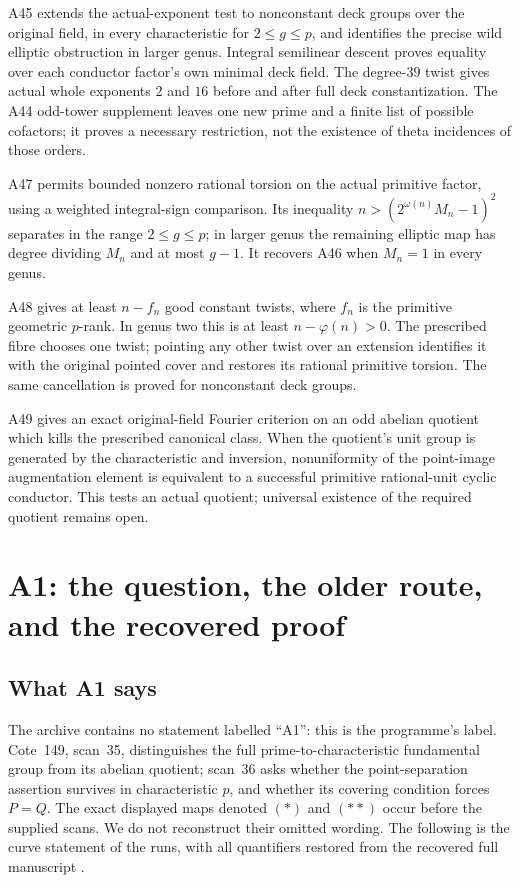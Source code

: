 \documentclass[11pt,a4paper]{article}
\begin{document}
A45 extends the actual-exponent test to nonconstant deck groups over the
original field, in every characteristic for $2\le g\le p$, and identifies
the precise wild elliptic obstruction in larger genus. Integral semilinear
descent proves equality over each conductor factor's own minimal deck field.
The degree-$39$ twist gives actual whole exponents $2$ and $16$ before and
after full deck constantization. The A44 odd-tower supplement leaves one
new prime and a finite list of possible cofactors; it proves a necessary
restriction, not the existence of theta incidences of those orders.

A47 permits bounded nonzero rational torsion on the actual primitive
factor, using a weighted integral-sign comparison. Its inequality
$n>(2^{\omega(n)}M_n-1)^2$ separates in the range $2\le g\le p$;
in larger genus the remaining elliptic map has degree dividing $M_n$
and at most $g-1$. It recovers A46 when $M_n=1$ in every genus.

A48 gives at least $n-f_n$ good constant twists, where $f_n$ is the
primitive geometric $p$-rank. In genus two this is at least
$n-\varphi(n)>0$. The prescribed fibre chooses one twist;
pointing any other twist over an extension identifies it with the
original pointed cover and restores its rational primitive torsion.
The same cancellation is proved for nonconstant deck groups.

A49 gives an exact original-field Fourier criterion on an odd abelian
quotient which kills the prescribed canonical class. When the quotient's
unit group is generated by the characteristic and inversion, nonuniformity
of the point-image augmentation element is equivalent to a successful
primitive rational-unit cyclic conductor. This tests an actual quotient;
universal existence of the required quotient remains open.


\section{A1: the question, the older route, and the recovered proof}
\label{sec:a1}

\subsection{What A1 says}
The archive contains no statement labelled ``A1'': this is the programme's
label. Cote~149, scan~35, distinguishes the full prime-to-characteristic
fundamental group from its abelian quotient; scan~36 asks whether the
point-separation assertion survives in characteristic $p$, and whether its
covering condition forces $P=Q$. The exact displayed maps denoted $(*)$ and
$(**)$ occur before the supplied scans. We do not reconstruct their omitted
wording. The following is the curve statement of the runs, with all
quantifiers restored from the recovered full manuscript
\cite[A.1, A.31--A.33]{A1run}.
\end{document}

